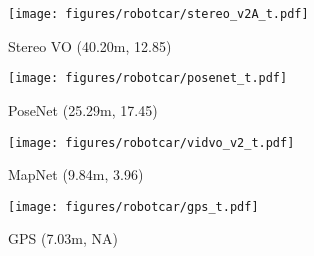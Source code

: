 \begin{figure*}[h!]
    \small
    \captionsetup[subfigure]{labelformat=empty}
    \centering
    \begin{subfigure}{0.24\linewidth}
        \centering
        \texttt{[image: figures/robotcar/stereo\_v2A\_t.pdf]}
        \vspace{-1.5em}
        \caption{\small Stereo VO (40.20m, 12.85\degree) }
    \end{subfigure}
    \hfill
    \begin{subfigure}{0.24\linewidth}
        \centering
        \texttt{[image: figures/robotcar/posenet\_t.pdf]}
        \vspace{-1.5em}
        \caption{\small PoseNet (25.29m, 17.45\degree)}
    \end{subfigure}
    \hfill
    \begin{subfigure}{0.24\linewidth}
        \centering
        \texttt{[image: figures/robotcar/vidvo\_v2\_t.pdf]}
        \vspace{-1.5em}
        \caption{\small MapNet (9.84m, 3.96\degree)}
    \end{subfigure}
    \hfill
    \begin{subfigure}{0.24\linewidth}
        \centering
        \texttt{[image: figures/robotcar/gps\_t.pdf]}
        \vspace{-1.5em}
        \caption{\small GPS (7.03m, NA) }
    \end{subfigure}


\end{figure*}
